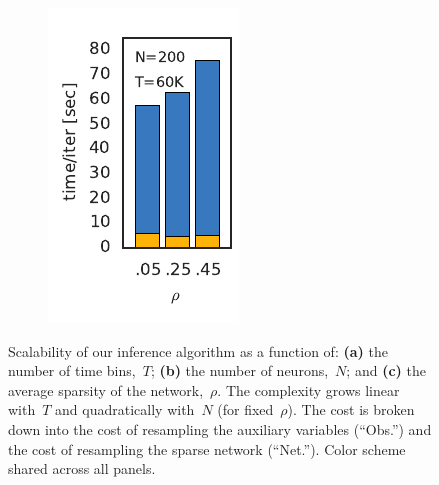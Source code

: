 \begin{figure}[t!]
\begin{subfigure}[b]{1.27in}
    \includegraphics[width=\textwidth]{figures/ch5/runtime_vs_rho.pdf}
    \label{fig:runtime_vs_rho}
  \end{subfigure}
  \vspace{-2em}
  \caption[Scalability of the proposed Bayesian inference algorithm]{
    Scalability of our inference algorithm as a function of: 
    \textbf{(a)} the number of time bins,~$T$;
    \textbf{(b)} the number of neurons,~$N$; and
    \textbf{(c)} the average sparsity of the network,~$\rho$.
    The complexity grows linear with~$T$ and quadratically with~$N$
    (for fixed~$\rho$). The cost is broken down into the cost of
    resampling the \polyagamma auxiliary variables (``Obs.'') and
    the cost of resampling the sparse network (``Net.''). Color
    scheme shared across all panels.
  }
  \label{fig:scalability}
\end{figure}


